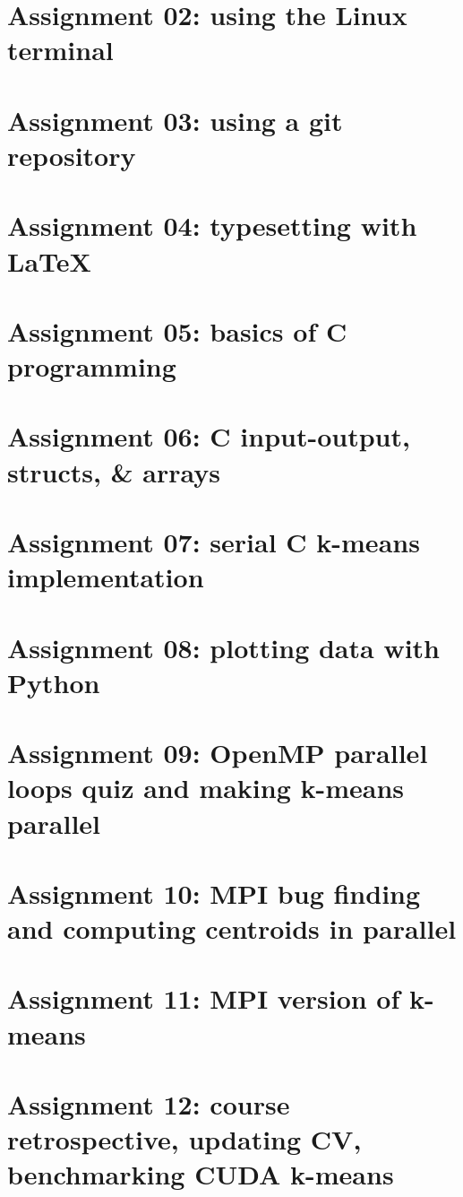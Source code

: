 

\section{Assignment 02: using the Linux terminal}


\newpage
\section{Assignment 03: using a git repository}


\newpage
\section{Assignment 04: typesetting with \LaTeX{}}


\newpage
\section{Assignment 05: basics of C programming}


\newpage
\section{Assignment 06: C input-output, structs, \& arrays}


\newpage
\section{Assignment 07: serial C k-means implementation}


\newpage
\section{Assignment 08: plotting data with Python}


\newpage
\section{Assignment 09: OpenMP parallel loops quiz and making k-means parallel}


\newpage
\section{Assignment 10: MPI bug finding and computing centroids in parallel}



\newpage
\section{Assignment 11: MPI version of k-means}


\newpage
\section{Assignment 12: course retrospective, updating CV, benchmarking CUDA k-means}


